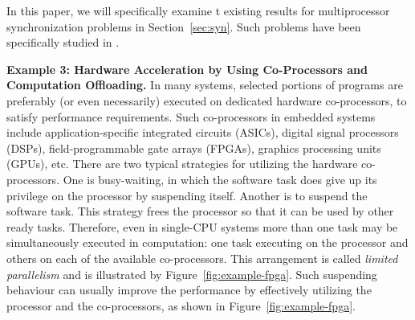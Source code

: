 
In this paper, we will specifically examine t existing results for multiprocessor synchronization problems in Section~\ref{sec:syn}. Such problems have been specifically studied in \cite{rajkumar-1990,lakshmanan-2009,zeng-2011,bbb-2013,yang-2013,kim-2014,han-2014,carminati-2014,yang-2014}.

{\bf Example 3: Hardware Acceleration by Using Co-Processors and Computation Offloading.} In many systems, selected portions of programs are preferably (or even necessarily) executed on dedicated hardware co-processors, to satisfy performance requirements.  Such co-processors in embedded systems include application-specific integrated circuits (ASICs), digital signal processors (DSPs), field-programmable gate arrays (FPGAs), graphics processing units (GPUs), etc. There are two typical strategies for utilizing the hardware co-processors. One is busy-waiting, in which the software task does give up its privilege on the processor by suspending itself. Another is to suspend the software task. This strategy frees the processor so that it can be used by other ready tasks. Therefore, even in single-CPU systems more than one task may be simultaneously executed in computation: one task executing on the processor and others on each of the available co-processors. This arrangement is called \emph{limited parallelism} \cite{RTAS-AudsleyB04} and is illustrated by Figure~\ref{fig:example-fpga}. Such suspending behaviour can usually improve the performance by effectively utilizing the processor and the co-processors, as shown in Figure~\ref{fig:example-fpga}.


